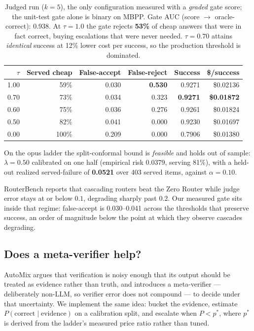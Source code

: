 \documentclass[11pt]{article}
\begin{document}
\begin{table}[h]
\centering
\begin{tabular}{@{}rrrrrr@{}}
\toprule
$\tau$ & \textbf{Served cheap} & \textbf{False-accept} & \textbf{False-reject} & \textbf{Success} & \textbf{\$/success} \\
\midrule
1.00 & 59\% & 0.030 & \textbf{0.530} & 0.9271 & \$0.02136 \\
0.70 & 73\% & 0.034 & 0.323 & \textbf{0.9271} & \textbf{\$0.01872} \\
0.60 & 75\% & 0.036 & 0.276 & 0.9261 & \$0.01824 \\
0.50 & 82\% & 0.041 & 0.000 & 0.9230 & \$0.01697 \\
0.00 & 100\% & 0.209 & 0.000 & 0.7906 & \$0.01380 \\
\bottomrule
\end{tabular}
\caption{Judged run ($k{=}5$), the only configuration measured with a \emph{graded} gate score;
the unit-test gate alone is binary on MBPP. Gate AUC (score $\rightarrow$ oracle-correct): 0.938.
At $\tau = 1.0$ the gate rejects \textbf{53\%} of cheap answers that were in fact correct, buying
escalations that were never needed. $\tau = 0.70$ attains \emph{identical} success at 12\% lower
cost per success, so the production threshold is dominated.}
\end{table}

On the opus ladder the split-conformal bound is \emph{feasible} and holds out of sample:
$\lambda = 0.50$ calibrated on one half (empirical risk 0.0379, serving 81\%), with a held-out
realized served-failure of \textbf{0.0521} over 403 served items, against $\alpha = 0.10$.

RouterBench reports that cascading routers beat the Zero Router while judge error stays at or below
$0.1$, degrading sharply past $0.2$. Our measured gate sits inside that regime: false-accept is
0.030--0.041 across the thresholds that preserve success, an order of magnitude below the point at
which they observe cascades degrading.

\subsection{Does a meta-verifier help?}
\label{sec:results-meta}

AutoMix argues that verification is noisy enough that its output should be treated as evidence
rather than truth, and introduces a meta-verifier --- deliberately non-LLM, so verifier error does
not compound --- to decide under that uncertainty. We implement the same idea: bucket the evidence,
estimate $P(\text{correct} \mid \text{evidence})$ on a calibration split, and escalate when
$P < p^\ast$, where $p^\ast$ is derived from the ladder's measured price ratio rather than tuned.
\end{document}
